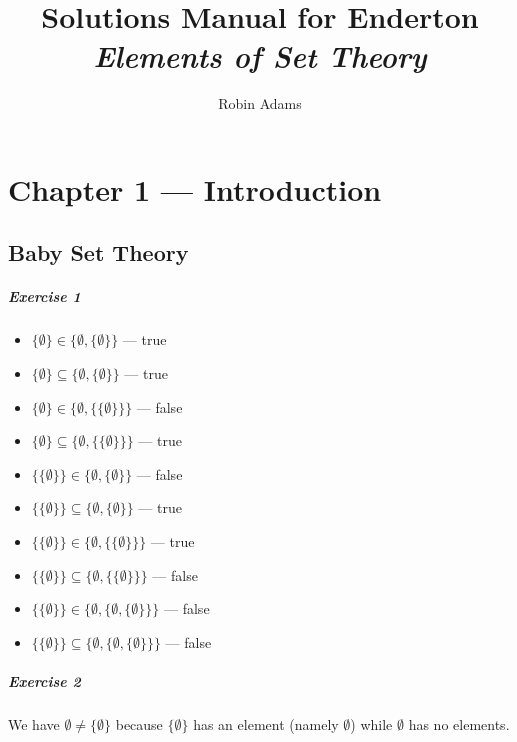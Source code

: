 \documentclass{report}
\title{Solutions Manual for Enderton \emph{Elements of Set Theory}}
\author{Robin Adams}
\begin{document}
    \maketitle
    \tableofcontents

    \chapter{Chapter 1 --- Introduction}

    \section{Baby Set Theory}

    \paragraph{Exercise 1}
    \begin{itemize}
        \item $\{ \emptyset \} \in \{ \emptyset, \{ \emptyset \} \}$ --- true
        \item $\{ \emptyset \} \subseteq \{ \emptyset, \{ \emptyset \} \}$ --- true
        \item $\{ \emptyset \} \in \{ \emptyset, \{ \{ \emptyset \} \} \}$ --- false
        \item $\{ \emptyset \} \subseteq \{ \emptyset, \{ \{ \emptyset \} \} \}$ --- true
        \item $\{ \{ \emptyset \} \} \in \{ \emptyset, \{ \emptyset \} \}$ --- false
        \item $\{ \{ \emptyset \} \} \subseteq \{ \emptyset, \{ \emptyset \} \}$ --- true
        \item $\{ \{ \emptyset \} \} \in \{ \emptyset, \{ \{ \emptyset \} \} \}$ --- true
        \item $\{ \{ \emptyset \} \} \subseteq \{ \emptyset, \{ \{ \emptyset \} \} \}$ --- false
        \item $\{ \{ \emptyset \} \} \in \{ \emptyset, \{ \emptyset, \{ \emptyset \} \} \}$ --- false
        \item $\{ \{ \emptyset \} \} \subseteq \{ \emptyset, \{ \emptyset, \{ \emptyset \} \} \}$ --- false
    \end{itemize}

    \paragraph{Exercise 2}
    We have $\emptyset \neq \{ \emptyset \}$ because $\{ \emptyset \}$ has an element (namely $\emptyset$)
    while $\emptyset$ has no elements.
\end{document}

